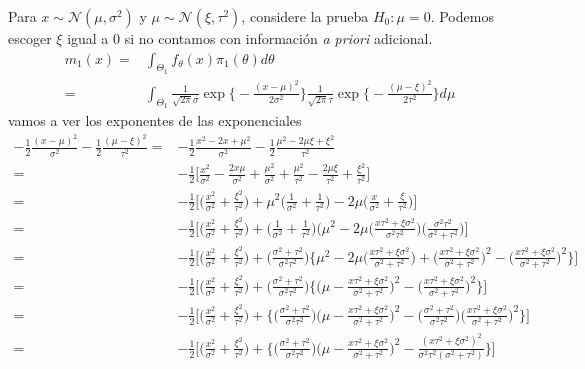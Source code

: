 \documentclass[12pt,]{article}
\begin{document}
Para \(x\sim\mathcal{N}(\mu,\sigma^2)\) y
\(\mu\sim\mathcal{N}(\xi,\tau^2)\), considere la prueba \(H_0:\mu=0\).
Podemos escoger \(\xi\) igual a \(0\) si no contamos con información
\emph{a priori} adicional. \[
\begin{array}{rl}
m_1(x)=&\displaystyle\int_{\Theta_1}f_\theta(x)\pi_1(\theta)d\theta\\
=&\displaystyle\int_{\Theta_1} \frac{1}{\sqrt{2\pi}\sigma}\exp\bigg\{-\frac{(x-\mu)^2}{2\sigma^2}\bigg\}
\frac{1}{\sqrt{2\pi}\tau}\exp\bigg\{-\frac{(\mu-\xi)^2}{2\tau^2}\bigg\}d\mu
\end{array}
\] vamos a ver los exponentes de las exponenciales \[
\begin{array}{rl}
-\frac{1}{2}\frac{(x-\mu)^2}{\sigma^2}-\frac{1}{2}\frac{(\mu-\xi)^2}{\tau^2}=&-\frac{1}{2}\frac{x^2-2x+\mu^2}{\sigma^2}-\frac{1}{2}\frac{\mu^2-2\mu\xi+\xi^2}{\tau^2}\\
=&-\frac{1}{2}\bigg[\frac{x^2}{\sigma^2}-\frac{2x\mu}{\sigma^2}+\frac{\mu^2}{\sigma^2}+\frac{\mu^2}{\tau^2}-\frac{2\mu\xi}{\tau^2}+\frac{\xi^2}{\tau^2}  \bigg]\\
=&-\frac{1}{2}\bigg[\bigg(\frac{x^2}{\sigma^2}+\frac{\xi^2}{\tau^2} \bigg)+\mu^2\bigg(\frac{1}{\sigma^2}+\frac{1}{\tau^2} \bigg) - 2\mu\bigg( \frac{x}{\sigma^2}+\frac{\xi}{\tau^2}  \bigg)  \bigg]\\
=&-\frac{1}{2}\bigg[\bigg(\frac{x^2}{\sigma^2}+\frac{\xi^2}{\tau^2} \bigg)+\bigg(\frac{1}{\sigma^2}+\frac{1}{\tau^2} \bigg)\bigg(\mu^2- 2\mu\bigg( \frac{x\tau^2+\xi\sigma^2}{\sigma^2\tau^2} \bigg)\bigg(\frac{\sigma^2\tau^2}{\sigma^2+\tau^2}\bigg)  \bigg]\\
=&-\frac{1}{2}\bigg[\bigg(\frac{x^2}{\sigma^2}+\frac{\xi^2}{\tau^2} \bigg)+\bigg(\frac{\sigma^2+\tau^2}{\sigma^2\tau^2} \bigg)\bigg\{\mu^2- 2\mu\bigg( \frac{x\tau^2+\xi\sigma^2}{\sigma^2+\tau^2} \bigg) +\bigg( \frac{x\tau^2+\xi\sigma^2}{\sigma^2+\tau^2} \bigg)^2-\bigg( \frac{x\tau^2+\xi\sigma^2}{\sigma^2+\tau^2} \bigg)^2 \bigg\}  \bigg]\\
=&-\frac{1}{2}\bigg[\bigg(\frac{x^2}{\sigma^2}+\frac{\xi^2}{\tau^2} \bigg)+\bigg(\frac{\sigma^2+\tau^2}{\sigma^2\tau^2} \bigg)\bigg\{\bigg(\mu -  \frac{x\tau^2+\xi\sigma^2}{\sigma^2+\tau^2} \bigg)^2-\bigg( \frac{x\tau^2+\xi\sigma^2}{\sigma^2+\tau^2} \bigg)^2 \bigg\}  \bigg]\\
=&-\frac{1}{2}\bigg[\bigg(\frac{x^2}{\sigma^2}+\frac{\xi^2}{\tau^2} \bigg)+\bigg\{\bigg(\frac{\sigma^2+\tau^2}{\sigma^2\tau^2} \bigg)\bigg(\mu -  \frac{x\tau^2+\xi\sigma^2}{\sigma^2+\tau^2} \bigg)^2-\bigg(\frac{\sigma^2+\tau^2}{\sigma^2\tau^2} \bigg)\bigg( \frac{x\tau^2+\xi\sigma^2}{\sigma^2+\tau^2} \bigg)^2 \bigg\}  \bigg]\\
=&-\frac{1}{2}\bigg[\bigg(\frac{x^2}{\sigma^2}+\frac{\xi^2}{\tau^2} \bigg)+\bigg\{\bigg(\frac{\sigma^2+\tau^2}{\sigma^2\tau^2} \bigg)\bigg(\mu -  \frac{x\tau^2+\xi\sigma^2}{\sigma^2+\tau^2} \bigg)^2-
\frac{(x\tau^2+\xi\sigma^2)^2}{\sigma^2\tau^2(\sigma^2+\tau^2)}  \bigg\}  \bigg]\\
\end{array}
\]
\end{document}
